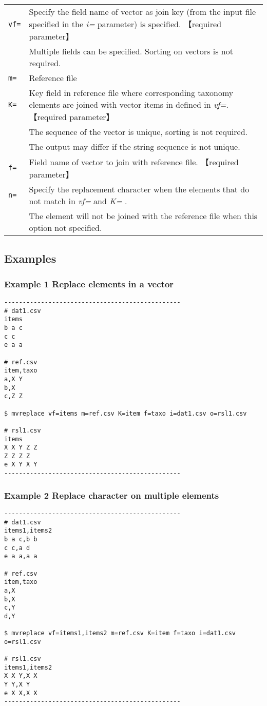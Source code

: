 \documentclass[a4paper]{jarticle}
\begin{document}
\begin{table}[htbp]
{\small
\begin{tabular}{ll}
\verb|vf=| & Specify the field name of vector as join key (from the input file specified in the \emph{i=} parameter) is specified. 【required parameter】\\
           & Multiple fields can be specified. Sorting on vectors is not required. \\
\verb|m=|  & Reference file  \\
\verb|K=|  &  Key field in reference file where corresponding taxonomy elements are joined with vector items in defined in \emph{vf=}. 【required parameter】\\
           & The sequence of the vector is unique, sorting is not required. \\
           & The output may differ if the string sequence is not unique.  \\ 
\verb|f=|  & Field name of vector to join with reference file. 【required parameter】\\
\verb|n=|  & Specify the replacement character when the elements that do not match in \emph{vf=} and \emph{K=} . \\
& The element will not be joined with the reference file when this option not specified.  \\
\end{tabular}
}
\end{table} 

\subsection*{Examples}
\subsubsection*{Example 1 Replace elements in a vector}
\begin{verbatim}
------------------------------------------------
# dat1.csv
items
b a c
c c
e a a

# ref.csv
item,taxo
a,X Y
b,X
c,Z Z

$ mvreplace vf=items m=ref.csv K=item f=taxo i=dat1.csv o=rsl1.csv 

# rsl1.csv
items
X X Y Z Z
Z Z Z Z
e X Y X Y
------------------------------------------------
\end{verbatim}

\subsubsection*{Example 2 Replace character on multiple elements}
\begin{verbatim}
------------------------------------------------
# dat1.csv
items1,items2
b a c,b b
c c,a d
e a a,a a

# ref.csv
item,taxo
a,X
b,X
c,Y
d,Y

$ mvreplace vf=items1,items2 m=ref.csv K=item f=taxo i=dat1.csv o=rsl1.csv

# rsl1.csv
items1,items2
X X Y,X X
Y Y,X Y
e X X,X X
------------------------------------------------
\end{verbatim}
\end{document}
